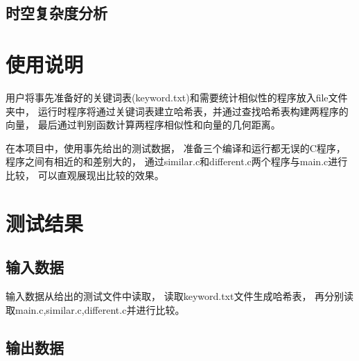 \documentclass[a4paper]{article}
\begin{document}
	\subsection{时空复杂度分析}\label{subsec:analysis2}


	\section{使用说明}\label{sec:instrut}
	{{用户将事先准备好的关键词表(keyword.txt)和需要统计相似性的程序放入file文件夹中，
	运行时程序将通过关键词表建立哈希表，并通过查找哈希表构建两程序的向量，
	最后通过判别函数计算两程序相似性和向量的几何距离。}}

	{{在本项目中，使用事先给出的测试数据，
	准备三个编译和运行都无误的C程序，程序之间有相近的和差别大的，
	通过similar.c和different.c两个程序与main.c进行比较，
	可以直观展现出比较的效果。}}


	\section{测试结果}\label{sec:result}

	\subsection{输入数据}\label{subsec:in}
	{{输入数据从给出的测试文件中读取，
	读取keyword.txt文件生成哈希表，
	再分别读取main.c,similar.c,different.c并进行比较。}}

	\subsection{输出数据}\label{subsec:out}







	\noindent{ }



	\noindent{ }

\end{document}
